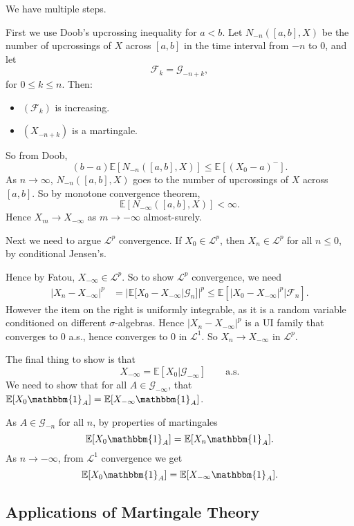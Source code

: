 \documentclass[12pt]{article}
\begin{document}
\begin{proofbox}
	We have multiple steps.

	First we use Doob's upcrossing inequality for $a < b$. Let $N_{-n}([a, b], X)$ be the number of upcrossings of $X$ across $[a, b]$ in the time interval from $-n$ to $0$, and let
	\[
	\mathcal{F}_k = \mathcal{G}_{-n + k},
	\]
	for $0 \leq k \leq n$. Then:
	\begin{itemize}
		\item $(\mathcal{F}_k)$ is increasing.
		\item $(X_{-n+k})$ is a martingale.
	\end{itemize}
	So from Doob,
	\[
		(b - a) \mathbb{E}[N_{-n}([a, b], X)] \leq \mathbb{E}[(X_0 - a)^{-}].
	\]
	As $n \to \infty$, $N_{-n}([a, b], X)$ goes to the number of upcrossings of $X$ across $[a, b]$. So by monotone convergence theorem,
	\[
		\mathbb{E}[N_{-\infty}([a, b], X)] < \infty.
	\]
	Hence $X_m \to X_{-\infty}$ as $m \to -\infty$ almost-surely.

	Next we need to argue $\mathcal{L}^p$ convergence. If $X_0 \in \mathcal{L}^p$, then $X_n \in \mathcal{L}^p$ for all $n \leq 0$, by conditional Jensen's.

	Hence by Fatou, $X_{-\infty} \in \mathcal{L}^p$. So to show $\mathcal{L}^p$ convergence, we need
	\begin{align*}
		|X_n - X_{-\infty}|^{p} &= |\mathbb{E}[X_0 - X_{-\infty} | \mathcal{G}_n]|^p \leq \mathbb{E}[|X_0 - X_{-\infty}|^p | \mathcal{F}_n].
	\end{align*}
	However the item on the right is uniformly integrable, as it is a random variable conditioned on different $\sigma$-algebras. Hence $|X_n - X_{-\infty}|^p$ is a UI family that converges to 0 a.s., hence converges to $0$ in $\mathcal{L}^1$. So $X_n \to X_{-\infty}$ in $\mathcal{L}^p$.

	The final thing to show is that
	\[
		X_{-\infty} = \mathbb{E}[X_0 | \mathcal{G}_{-\infty}] \qquad \text{a.s.}
	\]
	We need to show that for all $A \in \mathcal{G}_{-\infty}$, that $\mathbb{E}[X_0 \mathbbm{1}_{A}] = \mathbb{E}[X_{-\infty} \mathbbm{1}_{A}]$.

	As $A \in \mathcal{G}_{-n}$ for all $n$, by properties of martingales
	\[
	\mathbb{E}[X_0 \mathbbm{1}_{A}] = \mathbb{E}[X_n \mathbbm{1}_{A}].
	\]
	As $n \to -\infty$, from $\mathcal{L}^1$ convergence we get
	\[
	\mathbb{E}[X_0 \mathbbm{1}_{A}] = \mathbb{E}[X_{-\infty} \mathbbm{1}_{A}].
	\]
\end{proofbox}

\subsection{Applications of Martingale Theory}%
\label{sub:app_mart}
\end{document}
